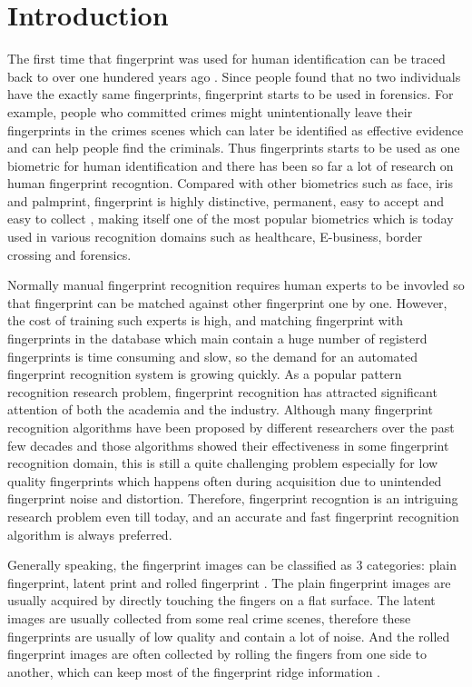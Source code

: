 \section{Introduction}
The first time that fingerprint was used for human identification can be traced back to over one hundered years ago \cite{Maltoni2009}. Since people found that no two individuals have the exactly same fingerprints, fingerprint starts to be used in forensics. For example, people who committed crimes might unintentionally leave their fingerprints in the crimes scenes which can later be identified as effective evidence and can help people find the criminals. Thus fingerprints starts to be used as one biometric for human identification and there has been so far a lot of research on human fingerprint recogntion. Compared with other biometrics such as face, iris and palmprint, fingerprint is highly distinctive, permanent, easy to accept and easy to collect \cite{Maltoni2009}, making itself one of the most popular biometrics which is today used in various recognition domains such as healthcare, E-business, border crossing and forensics.

Normally manual fingerprint recognition requires human experts to be invovled so that fingerprint can be matched against other fingerprint one by one. However, the cost of training such experts is high, and matching fingerprint with fingerprints in the database which main contain a huge number of registerd fingerprints is time consuming and slow, so the demand for an automated fingerprint recognition system is growing quickly. As a popular pattern recognition research problem, fingerprint recognition has attracted significant attention of both the academia and the industry. Although many fingerprint recognition algorithms have been proposed by different researchers over the past few decades and those algorithms showed their effectiveness in some fingerprint recognition domain, this is still a quite challenging problem especially for low quality fingerprints which happens often during acquisition due to unintended fingerprint noise and distortion. Therefore, fingerprint recogntion is an intriguing research problem even till today, and an accurate and fast fingerprint recognition algorithm is always preferred.

Generally speaking, the fingerprint images can be classified as 3 categories: plain fingerprint, latent print and rolled fingerprint \cite{nimkarFingerprintSegmentationAlgorithms2014}.
The plain fingerprint images are usually acquired by directly touching the fingers on a flat surface.
The latent images are usually collected from some real crime scenes, therefore these fingerprints are usually of low quality and contain a lot of noise.
And the rolled fingerprint images are often collected by rolling the fingers from one side to another, which can keep most of the fingerprint ridge information \cite{nimkarFingerprintSegmentationAlgorithms2014}.

